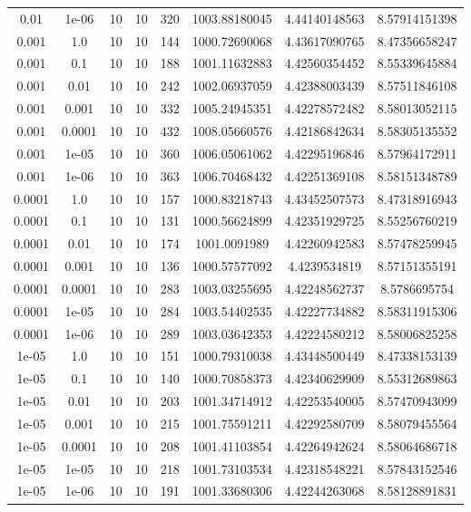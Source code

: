 \documentclass[11pt,a4paper]{article}
\begin{document}
\begin{table}
{\begin{tabular}{*{8}c}
 0.01 & 1e-06 &10 &10 & 320& 1003.88180045 & 4.44140148563 & 8.57914151398 \\
 0.001 & 1.0 &10 &10 & 144& 1000.72690068 & 4.43617090765 & 8.47356658247 \\
 0.001 & 0.1 &10 &10 & 188& 1001.11632883 & 4.42560354452 & 8.55339645884 \\
 0.001 & 0.01 &10 &10 & 242& 1002.06937059 & 4.42388003439 & 8.57511846108 \\
 0.001 & 0.001 &10 &10 & 332& 1005.24945351 & 4.42278572482 & 8.58013052115 \\
 0.001 & 0.0001 &10 &10 & 432& 1008.05660576 & 4.42186842634 & 8.58305135552 \\
 0.001 & 1e-05 &10 &10 & 360& 1006.05061062 & 4.42295196846 & 8.57964172911 \\
 0.001 & 1e-06 &10 &10 & 363& 1006.70468432 & 4.42251369108 & 8.58151348789 \\
 0.0001 & 1.0 &10 &10 & 157& 1000.83218743 & 4.43452507573 & 8.47318916943 \\
 0.0001 & 0.1 &10 &10 & 131& 1000.56624899 & 4.42351929725 & 8.55256760219 \\
 0.0001 & 0.01 &10 &10 & 174& 1001.0091989 & 4.42260942583 & 8.57478259945 \\
 0.0001 & 0.001 &10 &10 & 136& 1000.57577092 & 4.4239534819 & 8.57151355191 \\
 0.0001 & 0.0001 &10 &10 & 283& 1003.03255695 & 4.42248562737 & 8.5786695754 \\
 0.0001 & 1e-05 &10 &10 & 284& 1003.54402535 & 4.42227734882 & 8.58311915306 \\
 0.0001 & 1e-06 &10 &10 & 289& 1003.03642353 & 4.42224580212 & 8.58006825258 \\
 1e-05 & 1.0 &10 &10 & 151& 1000.79310038 & 4.43448500449 & 8.47338153139 \\
 1e-05 & 0.1 &10 &10 & 140& 1000.70858373 & 4.42340629909 & 8.55312689863 \\
 1e-05 & 0.01 &10 &10 & 203& 1001.34714912 & 4.42253540005 & 8.57470943099 \\
 1e-05 & 0.001 &10 &10 & 215& 1001.75591211 & 4.42292580709 & 8.58079455564 \\
 1e-05 & 0.0001 &10 &10 & 208& 1001.41103854 & 4.42264942624 & 8.58064686718 \\
 1e-05 & 1e-05 &10 &10 & 218& 1001.73103534 & 4.42318548221 & 8.57843152546 \\
 1e-05 & 1e-06 &10 &10 & 191& 1001.33680306 & 4.42244263068 & 8.58128891831 \\

\end{tabular}}
\end{table}
\end{document}

